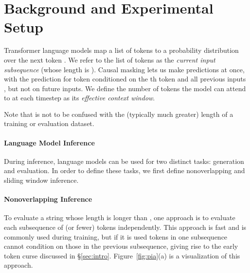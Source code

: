 \documentclass[11pt,a4paper]{article}
\begin{document}
\begin{figure*}[]
{{{\begin{tikzpicture}[
auto,
            node distance = 2cm, semithick, color_c,
        ]
\end{tikzpicture}} }}
  
 \caption{ \label{fig:pia} Dark red is the current subsequence, light red is the previous one. (a) During nonoverlapping training and inference, subsequences are processed independently.  (b) Sliding window inference with stride . (c) Caching, discussed in \S\ref{sec:PIA-caching}, where each subsequence attends to representations of the previous one. (In the iteration after this one, tokens 4, 5 and 6 become the cache, and are given position embeddings 1, 2 and 3, while the three new tokens get position embeddings 4, 5, and 6.)} 
\end{figure*} 





\section{Background and Experimental Setup}\label{sec:background}
Transformer language models map a list of tokens  to a probability distribution over the next token . We refer to the list of tokens as the \textit{current input subsequence} (whose length is ). Causal  masking  lets us make  predictions at once, with the prediction for token  conditioned on the th token and all previous inputs , but not on future inputs. 
We define the number of tokens the model can attend to at each timestep as its \emph{effective context window}. 
 
Note that  is not to be confused with the (typically much greater) length of a training or evaluation dataset.






\paragraph{Language Model Inference}
During inference, language models can be used for two distinct tasks: generation and evaluation. In order to define these tasks, we first define nonoverlapping and sliding window inference.




\paragraph{Nonoverlapping Inference}
To evaluate a string whose length is longer than , one approach is to evaluate each subsequence of  (or fewer) tokens independently. This approach is fast and is commonly used during training, but if it is used tokens in one subsequence cannot condition on those in the previous subsequence, giving rise to the early token curse discussed in \S\ref{sec:intro}. Figure~\ref{fig:pia}(a) is a visualization of this approach. 
\end{document}

